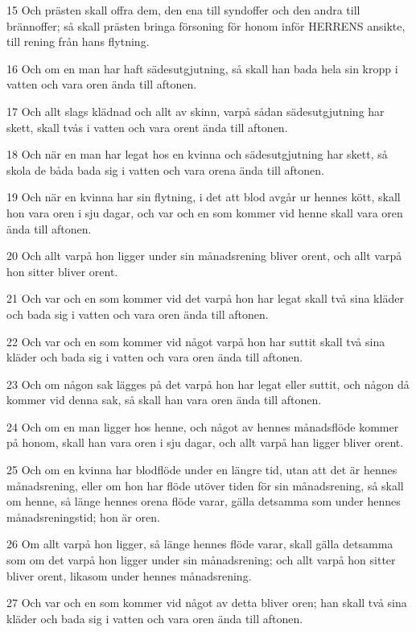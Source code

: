 \par 15 Och prästen skall offra dem, den ena till syndoffer och den andra till brännoffer; så skall prästen bringa försoning för honom inför HERRENS ansikte, till rening från hans flytning.
\par 16 Och om en man har haft sädesutgjutning, så skall han bada hela sin kropp i vatten och vara oren ända till aftonen.
\par 17 Och allt slags klädnad och allt av skinn, varpå sådan sädesutgjutning har skett, skall tvås i vatten och vara orent ända till aftonen.
\par 18 Och när en man har legat hos en kvinna och sädesutgjutning har skett, så skola de båda bada sig i vatten och vara orena ända till aftonen.
\par 19 Och när en kvinna har sin flytning, i det att blod avgår ur hennes kött, skall hon vara oren i sju dagar, och var och en som kommer vid henne skall vara oren ända till aftonen.
\par 20 Och allt varpå hon ligger under sin månadsrening bliver orent, och allt varpå hon sitter bliver orent.
\par 21 Och var och en som kommer vid det varpå hon har legat skall två sina kläder och bada sig i vatten och vara oren ända till aftonen.
\par 22 Och var och en som kommer vid något varpå hon har suttit skall två sina kläder och bada sig i vatten och vara oren ända till aftonen.
\par 23 Och om någon sak lägges på det varpå hon har legat eller suttit, och någon då kommer vid denna sak, så skall han vara oren ända till aftonen.
\par 24 Och om en man ligger hos henne, och något av hennes månadsflöde kommer på honom, skall han vara oren i sju dagar, och allt varpå han ligger bliver orent.
\par 25 Och om en kvinna har blodflöde under en längre tid, utan att det är hennes månadsrening, eller om hon har flöde utöver tiden för sin månadsrening, så skall om henne, så länge hennes orena flöde varar, gälla detsamma som under hennes månadsreningstid; hon är oren.
\par 26 Om allt varpå hon ligger, så länge hennes flöde varar, skall gälla detsamma som om det varpå hon ligger under sin månadsrening; och allt varpå hon sitter bliver orent, likasom under hennes månadsrening.
\par 27 Och var och en som kommer vid något av detta bliver oren; han skall två sina kläder och bada sig i vatten och vara oren ända till aftonen.
